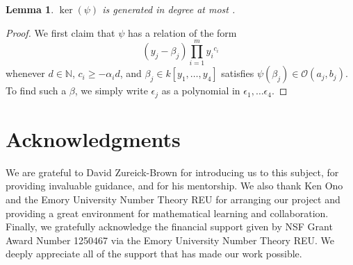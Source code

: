 \documentclass{amsart}
\theoremstyle{plain}
\newtheorem{lem}[thm]{Lemma}
\theoremstyle{definition}
\theoremstyle{remark}
\numberwithin{equation}{section}
\begin{document}
\begin{lem}
$\ker(\psi)$ is generated in degree at most .
\end{lem}
\begin{proof}
We first claim that $\psi$ has a relation of the form
\[
	(y_j - \beta_j)\prod_{i=1}^m {y_i}^{c_{i}}
\]
whenever $d\in \mathbb{N}$, $c_i \ge -\alpha_i d$, and $\beta_j \in k[y_1, \ldots, y_4]$ satisfies $\psi(\beta_j)\in \mathscr{O}(a_j, b_j)$.
To find such a $\beta$, we simply write $\epsilon_j$ as a polynomial in $\epsilon_1, \ldots \epsilon _4$.  


\end{proof}



\section{Acknowledgments}

We are grateful to David Zureick-Brown for introducing us to this
subject, for providing invaluable guidance,
and for his mentorship. We also thank Ken Ono and the
Emory University Number Theory REU for arranging our project and
providing a great environment for mathematical learning and
collaboration.
Finally, we gratefully acknowledge the financial support given by
NSF Grant Award Number 1250467 via the Emory University Number
Theory REU. We deeply appreciate all of the support that has made
our work possible.


\nocite{*}
{}

\end{document}
